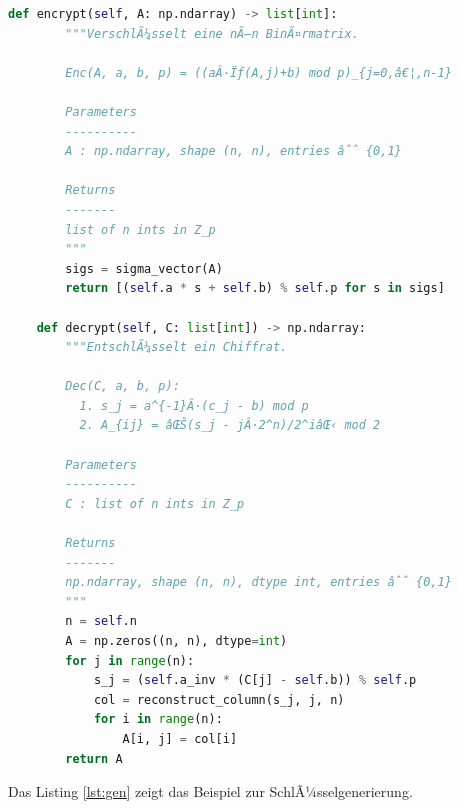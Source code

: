 ﻿\documentclass[a4paper,12pt]{scrreprt}
\theoremstyle{definition}
\begin{document}
\begin{lstlisting}[language=Python, caption=Signatur-Chiffre: Kernklasse, label=lst:chiffre]
    def encrypt(self, A: np.ndarray) -> list[int]:
        """VerschlÃ¼sselt eine nÃ—n BinÃ¤rmatrix.

        Enc(A, a, b, p) = ((aÂ·Ïƒ(A,j)+b) mod p)_{j=0,â€¦,n-1}

        Parameters
        ----------
        A : np.ndarray, shape (n, n), entries âˆˆ {0,1}

        Returns
        -------
        list of n ints in Z_p
        """
        sigs = sigma_vector(A)
        return [(self.a * s + self.b) % self.p for s in sigs]

    def decrypt(self, C: list[int]) -> np.ndarray:
        """EntschlÃ¼sselt ein Chiffrat.

        Dec(C, a, b, p):
          1. s_j = a^{-1}Â·(c_j - b) mod p
          2. A_{ij} = âŒŠ(s_j - jÂ·2^n)/2^iâŒ‹ mod 2

        Parameters
        ----------
        C : list of n ints in Z_p

        Returns
        -------
        np.ndarray, shape (n, n), dtype int, entries âˆˆ {0,1}
        """
        n = self.n
        A = np.zeros((n, n), dtype=int)
        for j in range(n):
            s_j = (self.a_inv * (C[j] - self.b)) % self.p
            col = reconstruct_column(s_j, j, n)
            for i in range(n):
                A[i, j] = col[i]
        return A
\end{lstlisting}

Das Listing \ref{lst:gen} zeigt das Beispiel zur SchlÃ¼sselgenerierung.
\end{document}
